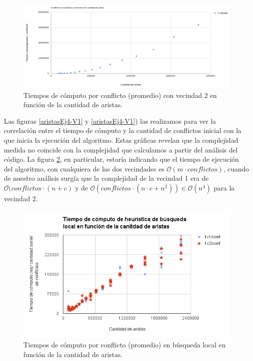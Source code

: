  \begin{figure}[H]
	\centering
 	\includegraphics[width=18cm]{imagenes/Ej4/tiempoPorConflictovsAristasV2.png}
	\caption{Tiempos de cómputo por conflicto (promedio) con vecindad 2 en función de la cantidad de aristas.}
	\label{aristasEj4-V2}
 \end{figure}
 
 Las figuras \ref{aristasEj4-V1} y \ref{aristasEj4-V1}) las realizamos para ver la correlación entre el tiempo de cómputo y la cantidad de conflictos inicial con la que inicia la ejecución del algoritmo. Estas gráficas revelan que la complejidad medida no coincide con la complejidad que calculamos a partir del análisis del código. La figura \ref{aristasEj4-2}, en particular, estaría indicando que el tiempo de ejecución del algoritmo, con cualquiera de las dos vecindades es $\mathcal{O}(m \cdot conflictos)$, cuando de nuestro análisis surgía que la complejidad de la vecindad 1 era de $\mathcal{O}(conflictos \cdot (n+c)$  y de $\mathcal{O}(conflictos \cdot (n \cdot c + n^2)) \in \mathcal{O}(n^4)$ para la vecindad 2.
 
 \begin{figure}[H]
	\centering
 	\includegraphics[width=18cm]{imagenes/Ej4/TvsAristas2.png}
	\caption{Tiempos de cómputo por conflicto (promedio) en búsqueda local en función de la cantidad de aristas.}
	\label{aristasEj4-2}
 \end{figure}
 
